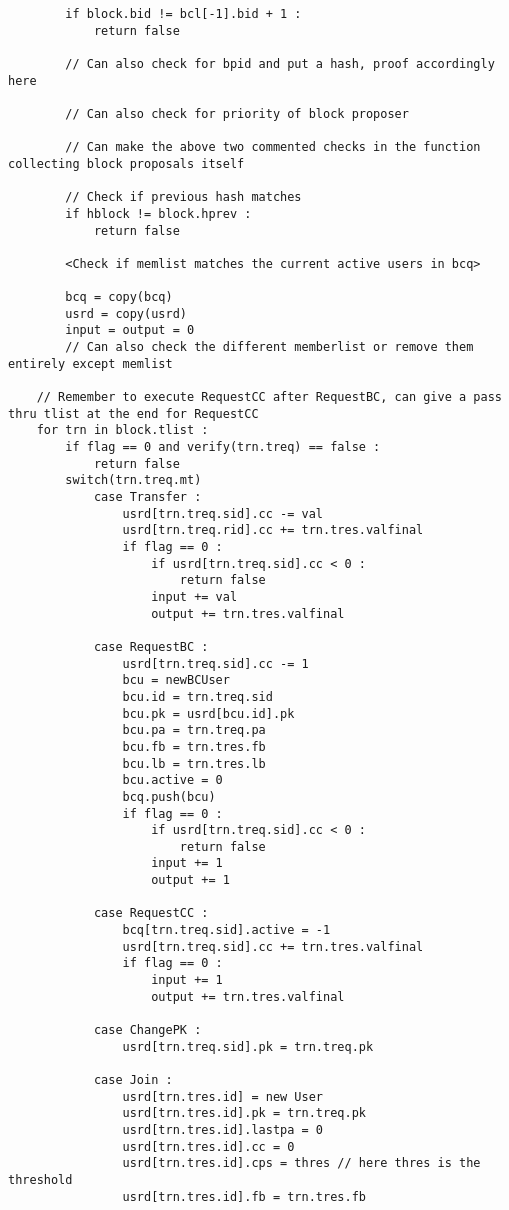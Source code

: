 \begin{enumerate}
\begin{lstlisting}
        if block.bid != bcl[-1].bid + 1 :
            return false
        
        // Can also check for bpid and put a hash, proof accordingly here

        // Can also check for priority of block proposer

        // Can make the above two commented checks in the function collecting block proposals itself
        
        // Check if previous hash matches
        if hblock != block.hprev :
            return false

        <Check if memlist matches the current active users in bcq>

        bcq = copy(bcq)
        usrd = copy(usrd)
        input = output = 0
        // Can also check the different memberlist or remove them entirely except memlist

    // Remember to execute RequestCC after RequestBC, can give a pass thru tlist at the end for RequestCC
    for trn in block.tlist :
        if flag == 0 and verify(trn.treq) == false :
            return false
        switch(trn.treq.mt)
            case Transfer :
                usrd[trn.treq.sid].cc -= val
                usrd[trn.treq.rid].cc += trn.tres.valfinal
                if flag == 0 :
                    if usrd[trn.treq.sid].cc < 0 :
                        return false
                    input += val
                    output += trn.tres.valfinal
            
            case RequestBC :
                usrd[trn.treq.sid].cc -= 1
                bcu = newBCUser
                bcu.id = trn.treq.sid
                bcu.pk = usrd[bcu.id].pk
                bcu.pa = trn.treq.pa
                bcu.fb = trn.tres.fb
                bcu.lb = trn.tres.lb
                bcu.active = 0
                bcq.push(bcu)
                if flag == 0 :
                    if usrd[trn.treq.sid].cc < 0 :
                        return false
                    input += 1
                    output += 1
            
            case RequestCC :
                bcq[trn.treq.sid].active = -1
                usrd[trn.treq.sid].cc += trn.tres.valfinal
                if flag == 0 :
                    input += 1
                    output += trn.tres.valfinal
            
            case ChangePK :
                usrd[trn.treq.sid].pk = trn.treq.pk
            
            case Join :
                usrd[trn.tres.id] = new User
                usrd[trn.tres.id].pk = trn.treq.pk
                usrd[trn.tres.id].lastpa = 0
                usrd[trn.tres.id].cc = 0
                usrd[trn.tres.id].cps = thres // here thres is the threshold
                usrd[trn.tres.id].fb = trn.tres.fb
    

\end{lstlisting}
\end{enumerate}
